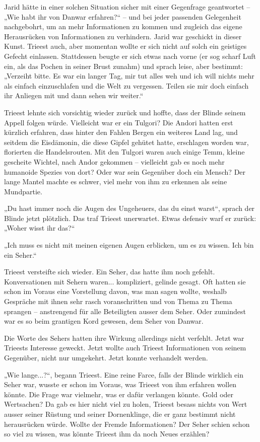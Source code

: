Jarid hätte in einer solchen Situation sicher mit einer Gegenfrage geantwortet – „Wie habt ihr von Danwar erfahren?“ – und bei jeder passenden Gelegenheit nachgebohrt, um an mehr Informationen zu kommen und zugleich das eigene Herausrücken von Informationen zu verhindern. Jarid war geschickt in dieser Kunst. Trieest auch, aber momentan wollte er sich nicht auf solch ein geistiges Gefecht einlassen. Stattdessen beugte er sich etwas nach vorne (er sog scharf Luft ein, als das Pochen in seiner Brust zunahm) und sprach leise, aber bestimmt: „Verzeiht bitte. Es war ein langer Tag, mir tut alles weh und ich will nichts mehr als einfach einzuschlafen und die Welt zu vergessen. Teilen sie mir doch einfach ihr Anliegen mit und dann sehen wir weiter.“

Trieest lehnte sich vorsichtig wieder zurück und hoffte, dass der Blinde seinem Appell folgen würde. Vielleicht war er ein Tulgori? Die Andori hatten erst kürzlich erfahren, dass hinter den Fahlen Bergen ein weiteres Land lag, und seitdem die Eisdämonin, die diese Gipfel gehütet hatte, erschlagen worden war, florierten die Handelsrouten. Mit den Tulgori waren auch einige Temm, kleine gescheite Wichtel, nach Andor gekommen – vielleicht gab es noch mehr humanoide Spezies von dort? Oder war sein Gegenüber doch ein Mensch? Der lange Mantel machte es schwer, viel mehr von ihm zu erkennen als seine Mundpartie.

„Du hast immer noch die Augen des Ungeheuers, das du einst warst“, sprach der Blinde jetzt plötzlich. Das traf Trieest unerwartet. Etwas defensiv warf er zurück: „Woher wisst ihr das?“

„Ich muss es nicht mit meinen eigenen Augen erblicken, um es zu wissen. Ich bin ein Seher.“

Trieest versteifte sich wieder. Ein Seher, das hatte ihm noch gefehlt. Konversationen mit Sehern waren... kompliziert, gelinde gesagt. Oft hatten sie schon im Voraus eine Vorstellung davon, was man sagen wollte, weshalb Gespräche mit ihnen sehr rasch voranschritten und von Thema zu Thema sprangen – anstrengend für alle Beteiligten ausser dem Seher. Oder zumindest war es so beim grantigen Kord gewesen, dem Seher von Danwar.

Die Worte des Sehers hatten ihre Wirkung allerdings nicht verfehlt. Jetzt war Trieests Interesse geweckt. Jetzt wollte auch Trieest Informationen von seinem Gegenüber, nicht nur umgekehrt. Jetzt konnte verhandelt werden.

„Wie lange...?“, begann Trieest. Eine reine Farce, falls der Blinde wirklich ein Seher war, wusste er schon im Voraus, was Trieest von ihm erfahren wollen könnte. Die Frage war vielmehr, was er dafür verlangen könnte. Gold oder Wertsachen? Da gab es hier nicht viel zu holen, Trieest besass nichts von Wert ausser seiner Rüstung und seiner Dornenklinge, die er ganz bestimmt nicht herausrücken würde. Wollte der Fremde Informationen? Der Seher schien schon so viel zu wissen, was könnte Trieest ihm da noch Neues erzählen?


